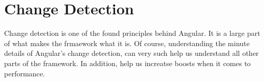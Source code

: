 \section{ Change Detection }
\maketitle{}

Change detection is one of the found principles behind Angular. It is a large
part of what makes the frmaework what it is. Of course, understanding the
minute details of Angular's change detection, can very such help us understand
all other parts of the framework. In addition, help us increatse boosts when it
comes to performance. 
